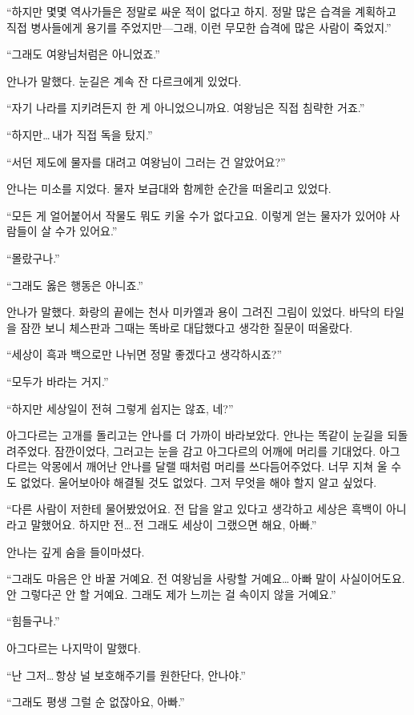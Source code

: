 ``하지만 몇몇 역사가들은 정말로 싸운 적이 없다고 하지. 정말 많은 습격을 계획하고 직접 병사들에게 용기를 주었지만—그래, 이런 무모한 습격에 많은 사람이 죽었지.''

``그래도 여왕님처럼은 아니었죠.''

안나가 말했다. 눈길은 계속 잔 다르크에게 있었다.

``자기 나라를 지키려든지 한 게 아니었으니까요. 여왕님은 직접 침략한 거죠.''

``하지만\ldots\,내가 직접 독을 탔지.''

``서던 제도에 물자를 대려고 여왕님이 그러는 건 알았어요?''

안나는 미소를 지었다. 물자 보급대와 함께한 순간을 떠올리고 있었다.

``모든 게 얼어붙어서 작물도 뭐도 키울 수가 없다고요. 이렇게 얻는 물자가 있어야 사람들이 살 수가 있어요.''

`` 몰랐구나.''

``그래도 옳은 행동은 아니죠.''

안나가 말했다. 화랑의 끝에는 천사 미카엘과 용이 그려진 그림이 있었다. 바닥의 타일을 잠깐 보니 체스판과 그때는 똑바로 대답했다고 생각한 질문이 떠올랐다.

``세상이 흑과 백으로만 나뉘면 정말 좋겠다고 생각하시죠?''

``모두가 바라는 거지.''

``하지만 세상일이 전혀 그렇게 쉽지는 않죠, 네?''

아그다르는 고개를 돌리고는 안나를 더 가까이 바라보았다. 안나는 똑같이 눈길을 되돌려주었다. 잠깐이었다, 그러고는 눈을 감고 아그다르의 어깨에 머리를 기대었다. 아그다르는 악몽에서 깨어난 안나를 달랠 때처럼 머리를 쓰다듬어주었다. 너무 지쳐 울 수도 없었다. 울어보아야 해결될 것도 없었다. 그저 무엇을 해야 할지 알고 싶었다.

``다른 사람이 저한테 물어봤었어요. 전 답을 알고 있다고 생각하고 세상은 흑백이 아니라고 말했어요. 하지만 전\ldots\,전 그래도 세상이 그랬으면 해요, 아빠.''

안나는 깊게 숨을 들이마셨다.

``그래도 마음은 안 바꿀 거예요. 전 여왕님을 사랑할 거예요\ldots\,아빠 말이 사실이어도요. 안 그렇다곤 안 할 거예요. 그래도 제가 느끼는 걸 속이지 않을 거예요.''

`` 힘들구나.''

아그다르는 나지막이 말했다.

``난 그저\ldots\,항상 널 보호해주기를 원한단다, 안나야.''

``그래도 평생 그럴 순 없잖아요, 아빠.''

